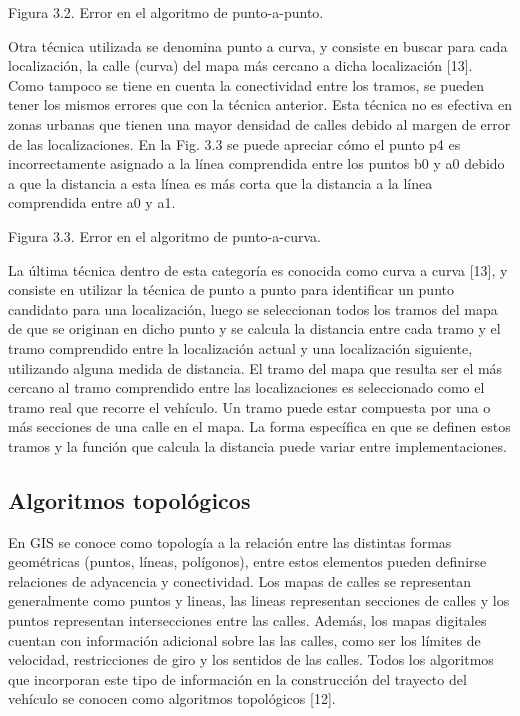 Figura 3.2. Error en el algoritmo de punto-a-punto.

Otra técnica utilizada se denomina punto a curva, y consiste en buscar para cada localización, la calle (curva) del mapa más cercano a dicha localización [13]. Como tampoco se tiene en cuenta la conectividad entre los tramos, se pueden tener los mismos errores que con la técnica anterior. Esta técnica no es efectiva en zonas urbanas que tienen una mayor densidad de calles debido al margen de error de las localizaciones. En la Fig. 3.3 se puede apreciar cómo el punto p4 es incorrectamente asignado a  la línea comprendida entre los puntos b0 y a0 debido a que la distancia a esta línea es más corta que la distancia a la línea comprendida entre a0 y a1.

Figura 3.3. Error en el algoritmo de punto-a-curva.

La última técnica dentro de esta categoría es conocida como curva a curva [13], y consiste en  utilizar la técnica de punto a punto para identificar un punto candidato para una localización, luego se seleccionan todos los tramos del mapa de que se originan en dicho punto y se calcula la distancia entre cada tramo y el tramo comprendido entre la localización actual y una localización siguiente, utilizando alguna medida de distancia. El tramo del mapa que resulta ser el más cercano al tramo comprendido entre las localizaciones es seleccionado como el tramo real que recorre el vehículo. Un tramo puede estar compuesta por una o más secciones de una calle en el mapa. La forma específica en que se definen estos tramos y la función que calcula la distancia puede variar entre implementaciones.

\subsection{Algoritmos topológicos}

En GIS se conoce como topología a la relación entre las distintas formas geométricas (puntos, líneas, polígonos), entre estos elementos pueden definirse relaciones de adyacencia y conectividad. Los mapas de calles se representan generalmente como puntos y lineas, las lineas representan secciones de calles y los puntos representan intersecciones entre las calles. Además, los mapas digitales cuentan con información adicional sobre las las calles, como ser los límites de velocidad, restricciones de giro y los sentidos de las calles. Todos los algoritmos que incorporan este tipo de información en la construcción del trayecto del vehículo se conocen como algoritmos topológicos [12].

